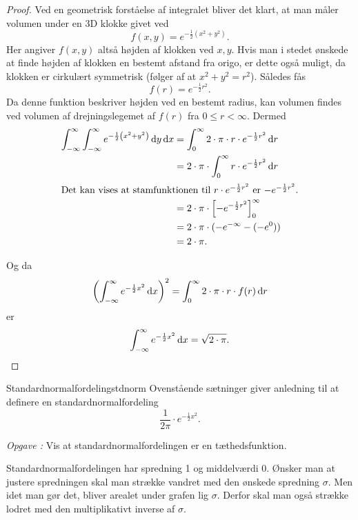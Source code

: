 \documentclass{article}
\newcounter{opgavecnt}
\newcommand{\opg}[1]{\stepcounter{opgavecnt}\textit{Opgave \arabic{opgavecnt}: }#1}
\begin{document}
\begin{proof}
    Ved en geometrisk forståelse af integralet bliver det klart, at man måler
    volumen under en 3D klokke givet ved
    \[
        f(x, y) = e^{-\frac{1}{2} (x^2 + y^2)}.
    \] 
    Her angiver $f(x, y)$ altså højden af klokken ved $x, y$. Hvis man i stedet
    ønskede at finde højden af klokken en bestemt afstand fra origo, er dette
    også muligt, da klokken er cirkulært symmetrisk (følger af at $x^2 + y^2 =
    r^2$). Således fås
    \[
        f(r) = e^{-\frac{1}{2}r^2}.
    \] 
    Da denne funktion beskriver højden ved en bestemt radius, kan volumen
    findes ved volumen af drejningslegemet af $f(r)$ fra $0 \leq r < \infty$.
    Dermed
    \begin{align*}
        \int_{-\infty}^\infty \int_{-\infty}^\infty e^{-\frac{1}{2} \left(x^2+y^2\right)} \,\mathrm{d} y \,\mathrm{d} x &= \int_0^\infty 2 \cdot \pi \cdot r \cdot e^{-\frac{1}{2}r^2} \,\mathrm{d} r\\
            &= 2 \cdot \pi \cdot \int_0^\infty r \cdot e^{-\frac{1}{2}r^2} \,\mathrm{d} r\\
            \intertext{Det kan vises at stamfunktionen til $r \cdot e^{-\frac{1}{2}r^2}$ er $-e^{-\frac{1}{2}r^2}$.}
            &= 2 \cdot \pi \cdot \left[ -e^{-\frac{1}{2}r^2} \right]_0^\infty\\
            &= 2 \cdot \pi \cdot (-e^{-\infty} - (-e^0))\\
            &= 2 \cdot \pi.
    \end{align*}

    Og da 
    \[
        \left(\int_{-\infty}^\infty e^{-\frac{1}{2}x^2} \,\mathrm{d} x\right)^2 = \int_0^\infty 2 \cdot \pi \cdot r \cdot f(r) \,\mathrm{d} r
    \] 
    er 
    \[
        \int_{-\infty}^\infty e^{-\frac{1}{2}x^2} \,\mathrm{d} x = \sqrt{2 \cdot \pi}.\qedhere
    \] 
\end{proof}

\begin{definition}{Standardnormalfordeling}{stdnorm}
    Ovenstående sætninger giver anledning til at definere en
    standardnormalfordeling
    \[
        \frac{1}{2\pi} \cdot e^{-\frac{1}{2}x^2}.
    \] 
\end{definition}

\opg{Vis at standardnormalfordelingen er en tæthedsfunktion.}

\smallskip

Standardnormalfordelingen har spredning 1 og middelværdi 0. Ønsker man at
justere spredningen skal man strække vandret med den ønskede spredning
$\sigma$. Men idet man gør det, bliver arealet under grafen lig $\sigma$.
Derfor skal man også strække lodret med den multiplikativt inverse af $\sigma$.
\end{document}
